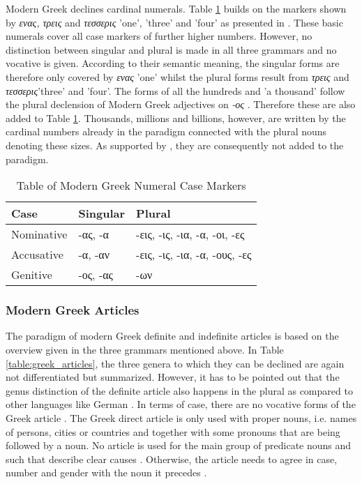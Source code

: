\documentclass[11pt,a4paper,twoside,openright]{scrbook}
\begin{document}
Modern Greek declines cardinal numerals. Table \ref{table:greek_numerals} builds on the markers shown by \foreignlanguage{greek}{\textit{ενας, τρεις} and \textit{τεσσερις}} 'one', 'three' and 'four' as presented in \citet{holton2016greek}. These basic numerals cover all case markers of further higher numbers. However, no distinction between singular and plural is made in all three grammars and no vocative is given. According to their semantic meaning, the singular forms are therefore only covered by \foreignlanguage{greek}{\textit{ενας}} 'one' whilst the plural forms result from \foreignlanguage{greek}{\textit{τρεις} and \textit{τεσσερις}}'three' and 'four'. The forms of all the hundreds and 'a thousand' follow the plural declension of Modern Greek adjectives on \foreignlanguage{greek}{\textit{-ος}} \citep{holton2016greek}. Therefore these are also added to Table \ref{table:greek_numerals}. Thousands, millions and billions, however, are written by the cardinal numbers already in the paradigm connected with the plural nouns denoting these sizes. As supported by \citet{ruge2001greek}, they are consequently not added to the paradigm.  

\begin{table}[!htbp]
\centering
\begin{tabular}{|p{3cm}||p{5cm}|p{5cm}|}
 \hline
 Case & Singular & Plural \\ [1ex]
 \hline\hline
 Nominative & \foreignlanguage{greek}{-ας, -α} & \foreignlanguage{greek}{-εις, -ις, -ια, -α, -οι, -ες}  \\ [1ex]
 \hline
 Accusative & \foreignlanguage{greek}{-α, -αν} & \foreignlanguage{greek}{-εις, -ις, -ια, -α, -ους, -ες } \\ [1ex]
 \hline
 Genitive & \foreignlanguage{greek}{-ος, -ας } & \foreignlanguage{greek}{-ων} \\ [1ex]
 \hline
\end{tabular}
\caption{Table of Modern Greek Numeral Case Markers}
\label{table:greek_numerals}
\end{table}



\subsubsection{Modern Greek Articles}

The paradigm of modern Greek definite and indefinite articles is based on the overview given in the three grammars mentioned above. In Table \ref{table:greek_articles}, the three genera to which they can be declined are again not differentiated but summarized. However, it has to be pointed out that the genus distinction of the definite article also happens in the plural as compared to other languages like German \citep{ruge2001greek}. In terms of case, there are no vocative forms of the Greek article \citep{ruge2001greek}. The Greek direct article is only used with proper nouns, i.e. names of persons, cities or countries and together with some pronouns that are being followed by a noun. No article is used for the main group of predicate nouns and such that describe clear causes \citep{metger1998greek}. Otherwise, the article needs to agree in case, number and gender with the noun it precedes \citep{holton2016greek}. 
\end{document}
